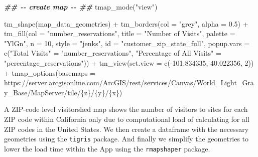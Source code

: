 \documentclass[
  11 pt,
  openany]{book}
\newenvironment{Shaded}{\begin{snugshade}}{\end{snugshade}}
\newcommand{\AttributeTok}[1]{\textcolor[rgb]{0.77,0.63,0.00}{#1}}
\newcommand{\DecValTok}[1]{\textcolor[rgb]{0.00,0.00,0.81}{#1}}
\newcommand{\DocumentationTok}[1]{\textcolor[rgb]{0.56,0.35,0.01}{\textbf{\textit{#1}}}}
\newcommand{\FloatTok}[1]{\textcolor[rgb]{0.00,0.00,0.81}{#1}}
\newcommand{\FunctionTok}[1]{\textcolor[rgb]{0.00,0.00,0.00}{#1}}
\newcommand{\NormalTok}[1]{#1}
\newcommand{\OtherTok}[1]{\textcolor[rgb]{0.56,0.35,0.01}{#1}}
\newcommand{\SpecialCharTok}[1]{\textcolor[rgb]{0.00,0.00,0.00}{#1}}
\newcommand{\StringTok}[1]{\textcolor[rgb]{0.31,0.60,0.02}{#1}}
\begin{document}
\begin{Shaded}
\begin{Highlighting}[]
\DocumentationTok{\#\# {-}{-} create map {-}{-} \#\#}
\FunctionTok{tmap\_mode}\NormalTok{(}\StringTok{"view"}\NormalTok{)}

\FunctionTok{tm\_shape}\NormalTok{(map\_data\_geometries) }\SpecialCharTok{+}
  \FunctionTok{tm\_borders}\NormalTok{(}\AttributeTok{col =} \StringTok{"grey"}\NormalTok{, }\AttributeTok{alpha =} \FloatTok{0.5}\NormalTok{) }\SpecialCharTok{+}
  \FunctionTok{tm\_fill}\NormalTok{(}\AttributeTok{col =} \StringTok{"number\_reservations"}\NormalTok{,}
          \AttributeTok{title =} \StringTok{"Number of Visits"}\NormalTok{,}
          \AttributeTok{palette =} \StringTok{"YlGn"}\NormalTok{,}
          \AttributeTok{n =} \DecValTok{10}\NormalTok{,}
          \AttributeTok{style =} \StringTok{"jenks"}\NormalTok{,}
          \AttributeTok{id =} \StringTok{"customer\_zip\_state\_full"}\NormalTok{,}
          \AttributeTok{popup.vars =} \FunctionTok{c}\NormalTok{(}\StringTok{"Total Visits"} \OtherTok{=} \StringTok{"number\_reservations"}\NormalTok{,}
                         \StringTok{"Percentage of All Visits"} \OtherTok{=} \StringTok{"percentage\_reservations"}\NormalTok{)) }\SpecialCharTok{+}
  \FunctionTok{tm\_view}\NormalTok{(}\AttributeTok{set.view =} \FunctionTok{c}\NormalTok{(}\SpecialCharTok{{-}}\FloatTok{101.834335}\NormalTok{, }\FloatTok{40.022356}\NormalTok{, }\DecValTok{2}\NormalTok{)) }\SpecialCharTok{+}
  \FunctionTok{tmap\_options}\NormalTok{(}\AttributeTok{basemaps =} \StringTok{\textquotesingle{}https://server.arcgisonline.com/ArcGIS/rest/services/Canvas/World\_Light\_Gray\_Base/MapServer/tile/\{z\}/\{y\}/\{x\}\textquotesingle{}}\NormalTok{)}
\end{Highlighting}
\end{Shaded}

A ZIP-code level visitorshed map shows the number of visitors to sites for each ZIP code within California only due to computational load of calculating for all ZIP codes in the United States. We then create a dataframe with the necessary geometries using the \texttt{tigris} \citep{R-tigris} package. And finally we simplify the geometries to lower the load time within the App using the \texttt{rmapshaper} \citep{R-rmapshaper} package.
\end{document}
